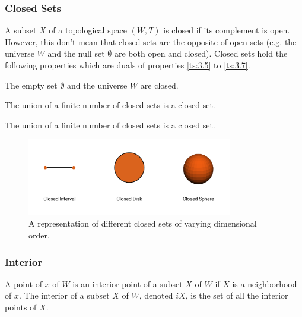 \documentclass[a4paper,11pt,oneside]{article}
\begin{document}
\subsubsection{Closed Sets}
\begin{definition}
	A subset $X$ of a topological space $(W, T)$ is closed if its complement is open. However, this don't mean that closed sets are the opposite of open sets (e.g. the universe $W$ and the null set $\emptyset$ are both open and closed). Closed sets hold the following properties which are duals of properties \eqref{ts:3.5} to \eqref{ts:3.7}.
		    
	\begin{property}
		The empty set $\emptyset$ and the universe $W$ are closed. \cite{mansfield_1987}
	\end{property}
	\begin{property}
		The union of a finite number of closed sets is a closed set. \cite{mansfield_1987}
	\end{property}
	\begin{property}
		The union of a finite number of closed sets is a closed set. \cite{mansfield_1987}
	\end{property}
\end{definition}
    
\begin{figure}[ht]
	\begin{center}
		\includegraphics[width=0.8\textwidth]{section3/3.1/closed.png}
	\end{center}
	\caption{A representation of different closed sets of varying dimensional order.}
	\label{sect3:closed_sets}
\end{figure}
    
\subsubsection{Interior}
     
\begin{definition}
	A point of $x$ of $W$ is an interior point of a subset $X$ of $W$ if $X$ is a neighborhood of $x$. The interior of a subset $X$ of $W$, denoted $iX$, is the set of all the interior points of $X$. \cite{Requicha1978MathematicalFO}
\end{definition}
     
\end{document}
